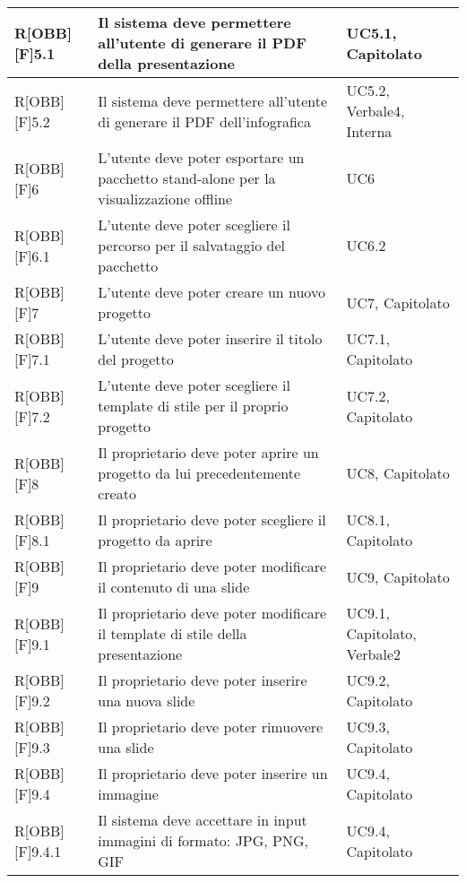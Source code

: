 \begin{table}[h]
\begin{tabular}{|p{}|p{}|p{}|}
		\end{tabular}
	\end{table}
	\newpage
	
	\begin{table}[h]
		\begin{tabular}{|p{}|p{}|p{}|}
			\midrule

R[OBB][F]5.1 & Il sistema deve permettere all'utente di generare il PDF della presentazione & UC5.1, Capitolato \\ \midrule
R[OBB][F]5.2 & Il sistema deve permettere all'utente di generare il PDF dell'\gls{infografica} & UC5.2, Verbale4, Interna \\ \midrule
R[OBB][F]6 & L'utente deve poter esportare un pacchetto stand-alone per la visualizzazione offline & UC6 \\ \midrule
R[OBB][F]6.1 & L'utente deve poter scegliere il percorso per il salvataggio del pacchetto & UC6.2 \\ \midrule
R[OBB][F]7 & L'utente deve poter creare un nuovo progetto & UC7, Capitolato \\ \midrule
R[OBB][F]7.1 & L'utente deve poter inserire il titolo del progetto & UC7.1, Capitolato \\ \midrule
R[OBB][F]7.2 & L'utente deve poter scegliere il \gls{template} di stile per il proprio progetto & UC7.2, Capitolato \\ \midrule
R[OBB][F]8 & Il proprietario deve poter aprire un progetto da lui precedentemente creato & UC8, Capitolato \\ \midrule
R[OBB][F]8.1 & Il proprietario deve poter scegliere il progetto da aprire & UC8.1, Capitolato \\ \midrule
R[OBB][F]9 & Il proprietario deve poter modificare il contenuto di una \gls{slide} & UC9, Capitolato \\ \midrule
R[OBB][F]9.1 & Il proprietario deve poter modificare il \gls{template} di stile della presentazione & UC9.1, Capitolato, Verbale2 \\ \midrule
R[OBB][F]9.2 & Il proprietario deve poter inserire una nuova \gls{slide} & UC9.2, Capitolato \\ \midrule
R[OBB][F]9.3 & Il proprietario deve poter rimuovere una \gls{slide} & UC9.3, Capitolato \\ \midrule
R[OBB][F]9.4 & Il proprietario deve poter inserire un immagine & UC9.4, Capitolato \\ \midrule
R[OBB][F]9.4.1 & Il sistema deve accettare in input immagini di formato: JPG, \gls{PNG}, GIF & UC9.4, Capitolato \\ \midrule

\end{tabular}
\end{table}
